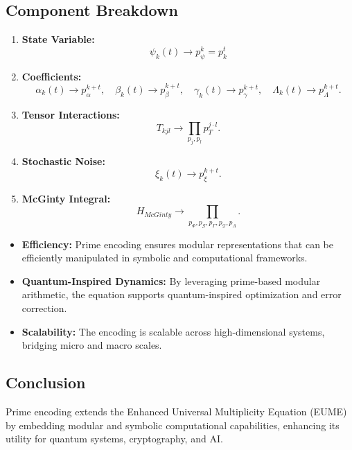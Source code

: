 \documentclass{article}
\theoremstyle{plain}
\begin{document}
\subsection{Component Breakdown}
\begin{enumerate}
    \item \textbf{State Variable:}
    \[
    \psi_k(t) \rightarrow p_\psi^k = p_k^t
    \]

    \item \textbf{Coefficients:}
    \[
    \alpha_k(t) \rightarrow p_\alpha^{k+t}, \quad 
    \beta_k(t) \rightarrow p_\beta^{k+t}, \quad
    \gamma_k(t) \rightarrow p_\gamma^{k+t}, \quad
    \Lambda_k(t) \rightarrow p_\Lambda^{k+t}.
    \]

    \item \textbf{Tensor Interactions:}
    \[
    T_{kjl} \rightarrow \prod_{p_j, p_l} p_T^{j \cdot l}.
    \]

    \item \textbf{Stochastic Noise:}
    \[
    \xi_k(t) \rightarrow p_\xi^{k+t}.
    \]

    \item \textbf{McGinty Integral:}
    \[
    H_{McGinty} \rightarrow \prod_{p_\Phi, p_\mathcal{G}, p_\Gamma, p_\mathcal{Q}, p_\Lambda}.
    \]
\end{enumerate}

\begin{itemize}
    \item \textbf{Efficiency:} Prime encoding ensures modular representations that can be efficiently manipulated in symbolic and computational frameworks.
    \item \textbf{Quantum-Inspired Dynamics:} By leveraging prime-based modular arithmetic, the equation supports quantum-inspired optimization and error correction.
    \item \textbf{Scalability:} The encoding is scalable across high-dimensional systems, bridging micro and macro scales.
\end{itemize}

\subsection*{Conclusion}
Prime encoding extends the Enhanced Universal Multiplicity Equation (EUME) by embedding modular and symbolic computational capabilities, enhancing its utility for quantum systems, cryptography, and AI.

\nocite{*}


\end{document}
